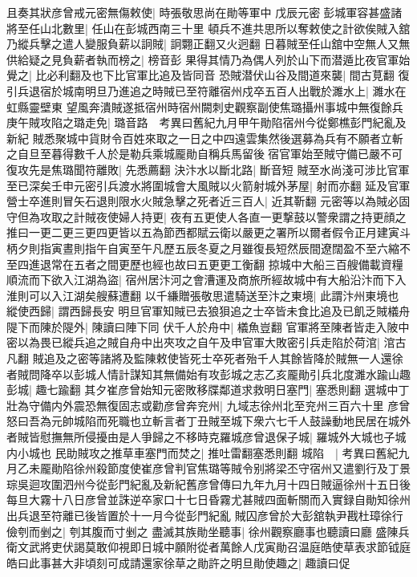 且奏其狀彦曾戒元密無傷敕使|{
	時張敬思尚在勛等軍中}
戊辰元密彭城軍容甚盛諸將至任山北數里|{
	任山在彭城西南三十里}
頓兵不進共思所以奪敕使之計欲俟賊入舘乃縱兵擊之遣人變服負薪以詗賊|{
	詗翾正翻又火迥翻}
日暮賊至任山舘中空無人又無供給疑之見負薪者執而榜之|{
	榜音彭}
果得其情乃為偶人列於山下而潜遁比夜官軍始覺之|{
	比必利翻及也下比官軍比追及皆同音}
恐賊潜伏山谷及間道來襲|{
	間古莧翻}
復引兵退宿於城南明旦乃進追之時賊已至符離宿州戍卒五百人出戰於濉水上|{
	濉水在虹縣靈壁東}
望風奔潰賊遂抵宿州時宿州闕刺史觀察副使焦璐攝州事城中無復餘兵庚午賊攻陷之璐走免|{
	璐音路　考異曰舊紀九月甲午勛陷宿州今從鄭樵彭門紀亂及新紀}
賊悉聚城中貨財令百姓來取之一日之中四遠雲集然後選募為兵有不願者立斬之自旦至暮得數千人於是勒兵乘城龎勛自稱兵馬留後宿官軍始至賊守備已嚴不可復攻先是焦璐聞符離敗|{
	先悉薦翻}
決汴水以斷北路|{
	斷音短}
賊至水尚淺可涉比官軍至已深矣壬申元密引兵渡水將圍城會大風賊以火箭射城外茅屋|{
	射而亦翻}
延及官軍營士卒進則冒矢石退則限水火賊急擊之死者近三百人|{
	近其靳翻}
元密等以為賊必固守但為攻取之計賊夜使婦人持更|{
	夜有五更使人各直一更撃鼓以警衆謂之持更顔之推曰一更二更三更四更皆以五為節西都賦云衛以嚴更之署所以爾者假令正月建寅斗柄夕則指寅晝則指午自寅至午凡歷五辰冬夏之月雖復長短然辰間遼闊盈不至六縮不至四進退常在五者之間更歷也經也故曰五更更工衡翻}
掠城中大船三百艘備載資糧順流而下欲入江湖為盜|{
	宿州居汴河之會漕運及商旅所經故城中有大船沿汴而下入淮則可以入江湖矣艘蘇遭翻}
以千縑贈張敬思遣騎送至汴之東境|{
	此謂汴州東境也}
縱使西歸|{
	謂西歸長安}
明旦官軍知賊已去狼狽追之士卒皆未食比追及已飢乏賊檥舟隄下而陳於隄外|{
	陳讀曰陣下同}
伏千人於舟中|{
	檥魚豈翻}
官軍將至陳者皆走入陂中密以為畏已縱兵追之賊自舟中出夾攻之自午及申官軍大敗密引兵走陷於荷涫|{
	涫古凡翻}
賊追及之密等諸將及監陳敕使皆死士卒死者殆千人其餘皆降於賊無一人還徐者賊問降卒以彭城人情計謀知其無備始有攻彭城之志乙亥龎勛引兵北度濉水踰山趣彭城|{
	趣七踰翻}
其夕崔彦曾始知元密敗移牒鄰道求救明日塞門|{
	塞悉則翻}
選城中丁壯為守備内外震恐無復固志或勸彦曾奔兖州|{
	九域志徐州北至兖州三百六十里}
彦曾怒曰吾為元帥城陷而死職也立斬言者丁丑賊至城下衆六七千人鼓譟動地民居在城外者賊皆慰撫無所侵擾由是人爭歸之不移時克羅城彦曾退保子城|{
	羅城外大城也子城内小城也}
民助賊攻之推草車塞門而焚之|{
	推吐雷翻塞悉則翻}
城陷　|{
	考異曰舊紀九月乙未龎勛陷徐州殺節度使崔彦曾判官焦璐等賊令别將梁丕守宿州又遣劉行及丁景琮吳迴攻圍泗州今從彭門紀亂及新紀舊彦曾傳曰九年九月十四日賊逼徐州十五日後每旦大霧十八日彦曾並誅逆卒家口十七日昏霧尤甚賊四面斬關而入實録自勛知徐州出兵退至符離已後皆置於十一月今從彭門紀亂}
賊囚彦曾於大彭舘執尹戡杜璋徐行儉刳而剉之|{
	刳其腹而寸剉之}
盡滅其族勛坐聽事|{
	徐州觀察廳事也聽讀曰廳}
盛陳兵衛文武將吏伏謁莫敢仰視即日城中願附從者萬餘人戊寅勛召温庭皓使草表求節钺庭皓曰此事甚大非頃刻可成請還家徐草之勛許之明旦勛使趣之|{
	趣讀曰促}
